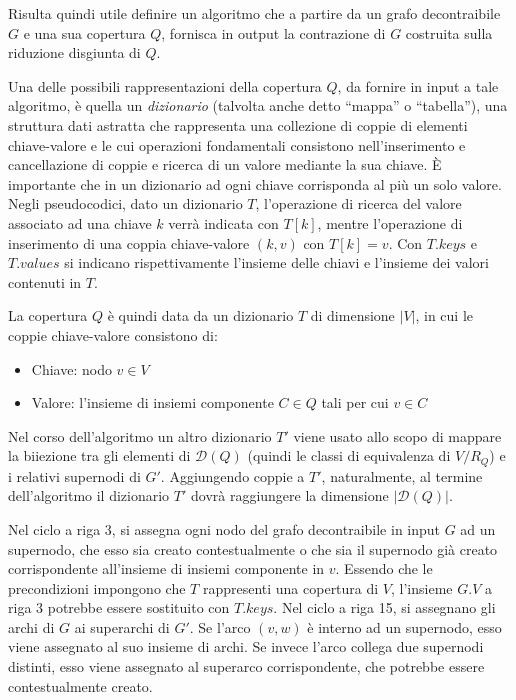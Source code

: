 Risulta quindi utile definire un algoritmo che a partire da un grafo decontraibile $G$ e una sua copertura $Q$,
fornisca in output la contrazione di $G$ costruita sulla riduzione disgiunta di $Q$. \newline

Una delle possibili rappresentazioni della copertura $Q$, da fornire in input a tale algoritmo, è quella un
\textit{dizionario} (talvolta anche detto ``mappa'' o ``tabella''), una struttura dati astratta che rappresenta una
collezione di coppie di elementi chiave-valore e le cui operazioni fondamentali consistono nell'inserimento e
cancellazione di coppie e ricerca di un valore mediante la sua chiave. \`E importante che in un dizionario
ad ogni chiave corrisponda al più un solo valore.
Negli pseudocodici, dato un dizionario $T$, l'operazione di ricerca del valore associato ad una chiave $k$ verrà
indicata con $T[k]$, mentre l'operazione di inserimento di una coppia chiave-valore $(k, v)$ con $T[k] = v$.
Con $T.keys$ e $T.values$ si indicano rispettivamente l'insieme delle chiavi e l'insieme dei valori contenuti in $T$.

La copertura $Q$ è quindi data da un dizionario $T$ di dimensione $|V|$, in cui le coppie chiave-valore consistono di:
\begin{itemize}
    \item Chiave: nodo $v \in V$
    \item Valore: l'insieme di insiemi componente $C \in Q$ tali per cui $v \in C$
\end{itemize}
\newpage

Nel corso dell'algoritmo un altro dizionario $T'$ viene usato allo scopo di mappare la biiezione tra gli elementi
di $\mathcal{D}(Q)$ (quindi le classi di equivalenza di $V/R_Q$) e i relativi supernodi di $G'$.
Aggiungendo coppie a $T'$, naturalmente, al termine dell'algoritmo il dizionario $T'$ dovrà raggiungere la dimensione
$|\mathcal{D}(Q)|$.

Nel ciclo a riga 3, si assegna ogni nodo del grafo decontraibile in input $G$ ad un supernodo, che esso sia
creato contestualmente o che sia il supernodo già creato corrispondente all'insieme di insiemi componente in $v$.
Essendo che le precondizioni impongono che $T$ rappresenti una copertura di $V$, l'insieme $G.V$ a riga 3
potrebbe essere sostituito con $T.keys$.
Nel ciclo a riga 15, si assegnano gli archi di $G$ ai superarchi di $G'$. Se l'arco $(v, w)$ è interno ad un
supernodo, esso viene assegnato al suo insieme di archi. Se invece l'arco collega due supernodi distinti, esso
viene assegnato al superarco corrispondente, che potrebbe essere contestualmente creato.

